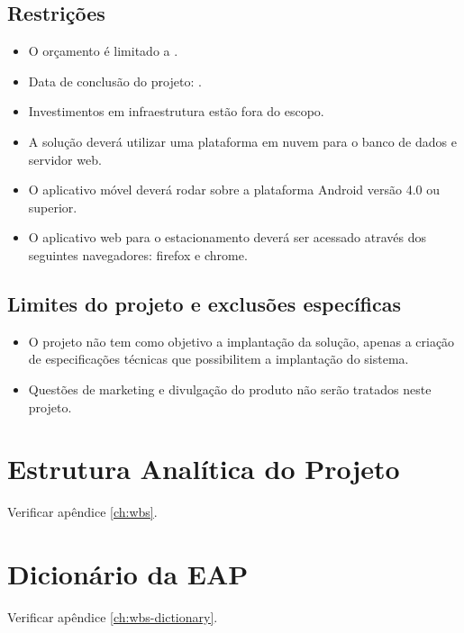 \subsection{Restrições}

\begin{itemize}
	\item O orçamento é limitado a \maximumBudget.
	\item Data de conclusão do projeto: \maximumDeadline.
	\item Investimentos em infraestrutura estão fora do escopo.
	\item A solução deverá utilizar uma plataforma em nuvem para o banco de dados e servidor web.
	\item O aplicativo móvel deverá rodar sobre a plataforma Android versão 4.0 ou superior.
	\item O aplicativo web para o estacionamento deverá ser acessado através dos seguintes navegadores: firefox e chrome.
\end{itemize}

\subsection{Limites do projeto e exclusões específicas}

\begin{itemize}
\item O projeto não tem como objetivo a implantação da solução, apenas a criação de especificações técnicas que possibilitem a implantação do sistema.
\item Questões de marketing e divulgação do produto não serão tratados neste projeto.
\end{itemize}

\section{Estrutura Analítica do Projeto}

Verificar apêndice \ref{ch:wbs}.

\section{Dicionário da EAP}

Verificar apêndice \ref{ch:wbs-dictionary}.

